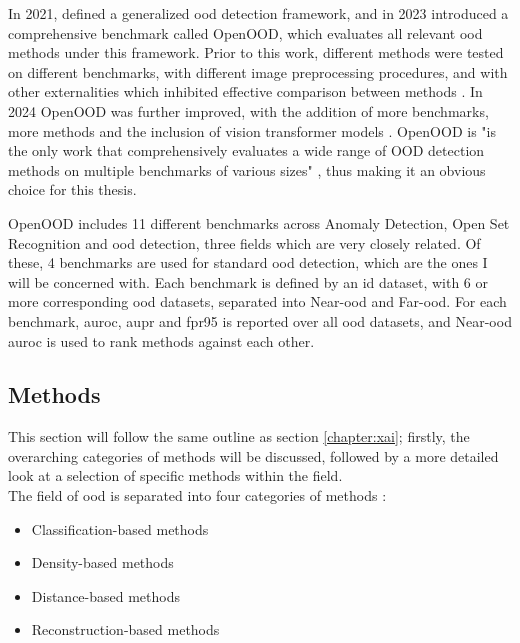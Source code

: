 \documentclass[UKenglish]{uiomasterthesis} %
\theoremstyle{definition}
\begin{document}
In 2021, \cite{oodoverview} defined a generalized \ac{ood} detection framework, and in 2023 \cite{openood} introduced a comprehensive benchmark called OpenOOD, which evaluates all relevant \ac{ood} methods under this framework. Prior to this work, different methods were tested on different benchmarks, with different image preprocessing procedures, and with other externalities which inhibited effective comparison between methods \cite{openood}. In 2024 OpenOOD was further improved, with the addition of more benchmarks, more methods and the inclusion of vision transformer models \cite{openood15}. OpenOOD is "is the only work that comprehensively evaluates a wide range of OOD detection methods on multiple benchmarks of various sizes" \cite{openood15}, thus making it an obvious choice for this thesis.

OpenOOD includes 11 different benchmarks across Anomaly Detection, Open Set Recognition and \ac{ood} detection, three fields which are very closely related. Of these, 4 benchmarks are used for standard \ac{ood} detection, which are the ones I will be concerned with. Each benchmark is defined by an \ac{id} dataset, with 6 or more corresponding \ac{ood} datasets, separated into Near-\ac{ood} and Far-\ac{ood}. For each benchmark, \ac{auroc}, \ac{aupr} and \ac{fpr95} is reported over all \ac{ood} datasets, and Near-\ac{ood} \ac{auroc} is used to rank methods against each other.

\subsection{Methods}

This section will follow the same outline as section \ref{chapter:xai}; firstly, the overarching categories of methods will be discussed, followed by a more detailed look at a selection of specific methods within the field.
\\

The field of \ac{ood} is separated into four categories of methods \cite{oodoverview}:

\begin{itemize}
  \item Classification-based methods
  \item Density-based methods
  \item Distance-based methods
  \item Reconstruction-based methods
\end{itemize}
\end{document}
